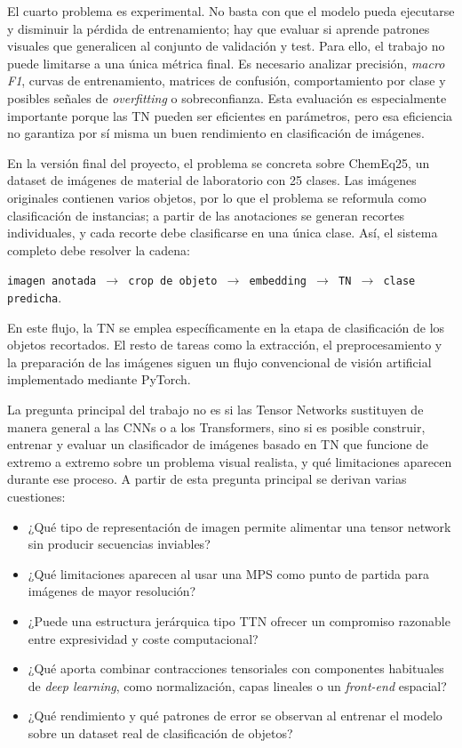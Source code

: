 El cuarto problema es experimental. No basta con que el modelo pueda ejecutarse y disminuir la pérdida de entrenamiento; hay que evaluar si aprende patrones visuales que generalicen al conjunto de validación y test. Para ello, el trabajo no puede limitarse a una única métrica final. Es necesario analizar precisión, \textit{macro F1}, curvas de entrenamiento, matrices de confusión, comportamiento por clase y posibles señales de \textit{overfitting} o sobreconfianza. Esta evaluación es especialmente importante porque las TN pueden ser eficientes en parámetros, pero esa eficiencia no garantiza por sí misma un buen rendimiento en clasificación de imágenes.

En la versión final del proyecto, el problema se concreta sobre ChemEq25, un dataset de imágenes de material de laboratorio con 25 clases. Las imágenes originales contienen varios objetos, por lo que el problema se reformula como clasificación de instancias; a partir de las anotaciones se generan recortes individuales, y cada recorte debe clasificarse en una única clase. Así, el sistema completo debe resolver la cadena:

\begin{center}
\texttt{imagen anotada $\rightarrow$ crop de objeto $\rightarrow$ embedding $\rightarrow$ TN $\rightarrow$ clase predicha}.
\end{center}

En este flujo, la TN se emplea específicamente en la etapa de clasificación de los objetos recortados. El resto de tareas como la extracción, el preprocesamiento y la preparación de las imágenes siguen un flujo convencional de visión artificial implementado mediante PyTorch.

La pregunta principal del trabajo no es si las Tensor Networks sustituyen de manera general a las CNNs o a los Transformers, sino si es posible construir, entrenar y evaluar un clasificador de imágenes basado en TN que funcione de extremo a extremo sobre un problema visual realista, y qué limitaciones aparecen durante ese proceso. A partir de esta pregunta principal se derivan varias cuestiones:

\begin{itemize}
    \item ¿Qué tipo de representación de imagen permite alimentar una tensor network sin producir secuencias inviables?
    \item ¿Qué limitaciones aparecen al usar una MPS como punto de partida para imágenes de mayor resolución?
    \item ¿Puede una estructura jerárquica tipo TTN ofrecer un compromiso razonable entre expresividad y coste computacional?
    \item ¿Qué aporta combinar contracciones tensoriales con componentes habituales de \textit{deep learning}, como normalización, capas lineales o un \textit{front-end} espacial?
    \item ¿Qué rendimiento y qué patrones de error se observan al entrenar el modelo sobre un dataset real de clasificación de objetos?
\end{itemize}

